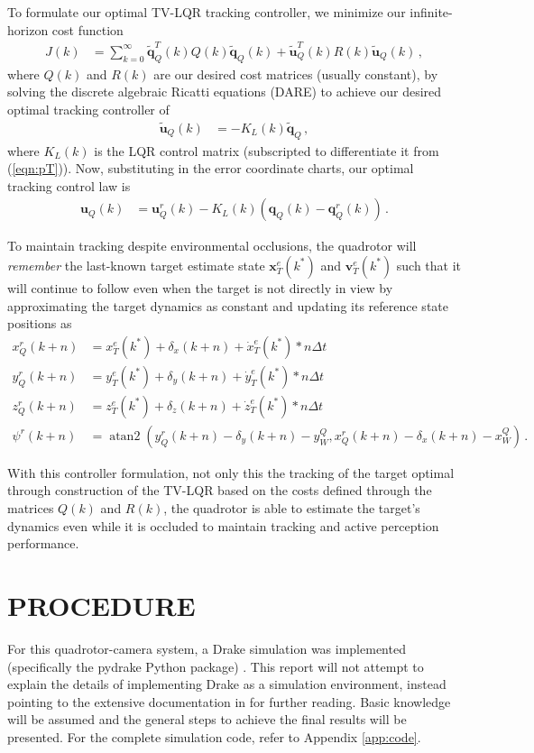 \documentclass[11pt]{article}
\DeclareMathOperator{\atantwo}{atan2}
\begin{document}
To formulate our optimal TV-LQR tracking controller, we minimize our infinite-horizon cost function
\begin{align*}
    J(k)&=\sum_{k=0}^\infty\tilde{\mathbf q}_Q^T(k)Q(k)\tilde{\mathbf q}_Q(k)+\tilde{\mathbf u}_Q^T(k)R(k)\tilde{\mathbf u}_Q(k)\,,
\end{align*}
where $Q(k)$ and $R(k)$ are our desired cost matrices (usually constant), by solving the discrete algebraic Ricatti equations (DARE) to achieve our desired optimal tracking controller of
\begin{align}\label{eqn:err_control}
    \tilde{\mathbf u}_Q(k)&=-K_L(k)\tilde{\mathbf q}_Q\,,
\end{align}
where $K_L(k)$ is the LQR control matrix (subscripted to differentiate it from (\ref{eqn:pT})). Now, substituting in the error coordinate charts, our optimal tracking control law is
\begin{align}\label{eqn:fin_control}
    \mathbf u_Q(k)&=\mathbf u_Q^r(k)-K_L(k)(\mathbf q_Q(k)-\mathbf q_Q^r(k))\,.
\end{align}

To maintain tracking despite environmental occlusions, the quadrotor will \textit{remember} the last-known target estimate state $\mathbf x_T^e(k^*)$ and $\mathbf v_T^e(k^*)$ such that it will continue to follow even when the target is not directly in view by approximating the target dynamics as constant and updating its reference state positions as
\begin{align}
    x_Q^r(k+n)&=x_T^e(k^*)+\delta_x(k+n)+\dot x_T^e(k^*)*n\Delta t\nonumber\\
    y_Q^r(k+n)&=y_T^e(k^*)+\delta_y(k+n)+\dot y_T^e(k^*)*n\Delta t\nonumber\\
    z_Q^r(k+n)&=z_T^e(k^*)+\delta_z(k+n)+\dot z_T^e(k^*)*n\Delta t\nonumber\\
    \psi^r(k+n)&=\atantwo(y_Q^r(k+n)-\delta_y(k+n)-y_W^Q,x_Q^r(k+n)-\delta_x(k+n)-x_W^Q)\,.\label{eqn:update_dyn}
\end{align}

With this controller formulation, not only this the tracking of the target optimal through construction of the TV-LQR based on the costs defined through the matrices $Q(k)$ and $R(k)$, the quadrotor is able to estimate the target's dynamics even while it is occluded to maintain tracking and active perception performance.

\section{PROCEDURE}\label{sec:procedure}
For this quadrotor-camera system, a Drake simulation was implemented (specifically the pydrake Python package) \cite{Drake}. This report will not attempt to explain the details of implementing Drake as a simulation environment, instead pointing to the extensive documentation in \cite{Drake} for further reading. Basic knowledge will be assumed and the general steps to achieve the final results will be presented. For the complete simulation code, refer to Appendix \ref{app:code}.
\end{document}
